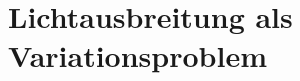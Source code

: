 \chapter{Lichtausbreitung als Variationsproblem}
\begin{refsection}

\renewcommand{\eqref}[1]{Gleichung~\ref{#1}}
\newcommand{\secref}[1]{Abschnitt~\ref{#1}}





\printbibliography[heading=subbibliography]
\end{refsection}

